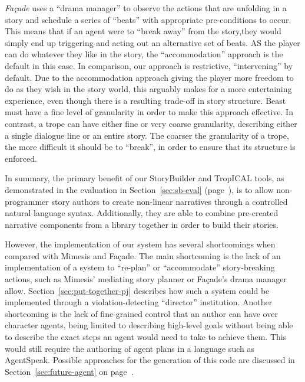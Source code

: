 \documentclass[11pt]{report}
\begin{document}
\emph{Fa\c{c}ade} uses a ``drama manager'' to observe the actions that are
unfolding in a story and schedule a series of ``beats'' with appropriate
pre-conditions to occur. This means that if an agent were to ``break away'' from
the story,they would simply end up triggering and acting out an alternative set
of beats. AS the player can do whatever they like in the story, the
``accommodation'' approach is the default in this case. In comparison, our
approach is restrictive, ``intervening'' by default. Due to the accommodation
approach giving the player more freedom to do as they wish in the story world,
this arguably makes for a more entertaining experience, even though there is a
resulting trade-off in story structure. Beast must have a fine level of
granularity in order to make this approach effective. In contrast, a trope can
have either fine or very coarse granularity, describing either a single dialogue
line or an entire story. The coarser the granularity of a trope, the more
difficult it should be to ``break'', in order to ensure that its structure is enforced.

In summary, the primary benefit of our StoryBuilder and TropICAL tools, as
demonstrated in the evaluation in Section~\ref{sec:sb-eval}
(page~\pageref{sec:sb-eval}), is to allow non-programmer story authors to create
non-linear narratives through a controlled natural language syntax.
Additionally, they are able to combine pre-created narrative components from a
library together in order to build their stories.

However, the implementation of our system has several shortcomings when compared
with Mimesis and Fa\c{c}ade. The main shortcoming is the lack of an
implementation of a system to ``re-plan'' or ``accommodate'' story-breaking
actions, such as Mimesis' mediating story planner or Fa\c{c}ade's drama manager
allow. Section~\ref{sec:put-together-pj} describes how such a system could be
implemented through a violation-detecting ``director'' institution.
Another shortcoming is the lack of fine-grained control that an author can have
over character agents, being limited to describing high-level goals without
being able to describe the exact steps an agent would need to take to achieve
them. This would still require the authoring of agent plans in a language such
as AgentSpeak. Possible approaches for the generation of this code are discussed
in Section~\ref{sec:future-agent} on page~\pageref{sec:future-agent}.
\end{document}
